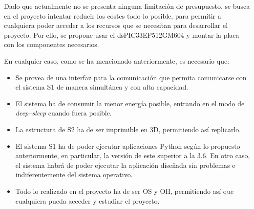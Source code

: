 Dado que actualmente no se presenta ninguna limitación de presupuesto, se busca en el proyecto intentar reducir los costes todo lo posible, para permitir a cualquiera poder acceder a los recursos que se necesitan para desarrollar el proyecto. Por ello, se propone usar el dsPIC33EP512GM604 y montar la placa con los componentes necesarios.

En cualquier caso, como se ha mencionado anteriormente, es necesario que:

\begin{itemize}
    \item Se provea de una interfaz para la comunicación que permita comunicarse con el sistema \ac{S1} de manera simultánea y con alta capacidad.
    \item El sistema ha de consumir la menor energía posible, entrando en el modo de \textit{deep--sleep} cuando fuera posible.
    \item La estructura de \ac{S2} ha de ser imprimible en 3D, permitiendo así replicarlo.
    \item El sistema \ac{S1} ha de poder ejecutar aplicaciones Python según lo propuesto anteriormente, en particular, la versión de este superior a la 3.6. En otro caso, el sistema habrá de poder ejecutar la aplicación diseñada sin problemas e indiferentemente del sistema operativo.
    \item Todo lo realizado en el proyecto ha de ser \ac{OS} y \ac{OH}, permitiendo así que cualquiera pueda acceder y estudiar el proyecto.
\end{itemize}